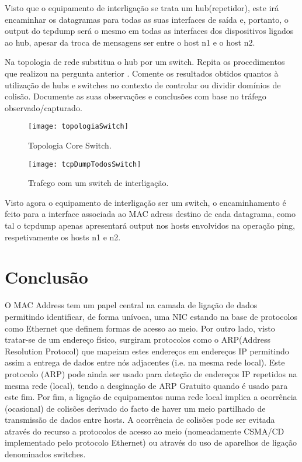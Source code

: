 \documentclass{exam}
\begin{document}
\begin{questions}
\begin{solution}
Visto que o equipamento de interligação se trata um hub(repetidor), este irá encaminhar
os datagramas para todas as suas interfaces de saída e, portanto, o output do tcpdump será o mesmo
em todas as interfaces dos dispositivos ligados ao hub, apesar da troca de mensagens ser entre o host n1 e o host n2. 
\end{solution}

\question Na topologia de rede substitua o hub por um switch. Repita os procedimentos que realizou na pergunta anterior .
Comente os resultados obtidos quantos à utilização de hubs e switches no contexto de controlar ou dividir domínios de colisão. Documente as suas observações e conclusões com base no tráfego observado/capturado.
\begin{figure}[H]
\centering\texttt{[image: topologiaSwitch]} 
\caption{\label{fig:controller}Topologia Core Switch.}
\end{figure}

\begin{figure}[H]
\centering\texttt{[image: tcpDumpTodosSwitch]} 
\caption{\label{fig:controller}Trafego com um switch de interligação.}
\end{figure}

\begin{solution}
Visto agora o equipamento de interligação ser um switch, o encaminhamento é feito para a interface associada ao MAC adress destino de cada 
datagrama, como tal o tcpdump apenas apresentará output nos hosts envolvidos na operação ping, respetivamente os hosts n1 e n2.
\end{solution}

\end{questions}

\section{Conclusão}
O MAC Address tem um papel central na camada de ligação de dados permitindo identificar, de forma unívoca, uma NIC estando na base de protocolos como Ethernet que definem formas de acesso ao meio. Por outro lado, visto tratar-se de um endereço físico, surgiram protocolos como o ARP(Address Resolution Protocol) que mapeiam estes endereços em endereços IP permitindo assim a entrega de dados entre nós adjacentes (i.e. na mesma rede local). Este protocolo (ARP) pode ainda ser usado para deteção de endereços IP repetidos na mesma rede (local), tendo a desginação de ARP Gratuito quando  é usado para este fim. Por fim, a ligação de equipamentos numa rede local implica a ocorrência (ocasional) de colisões derivado do facto de haver um meio partilhado de transmissão de dados entre hosts. A ocorrência de colisões pode ser evitada através do recurso a protocolos de
 acesso ao meio (nomeadamente CSMA/CD implementado pelo protocolo Ethernet) ou através do uso de aparelhos de ligação denominados switches.
\end{document}
